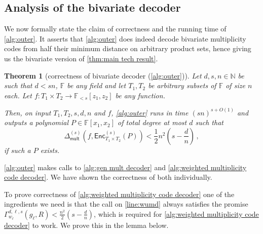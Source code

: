 \documentclass{article}
\newtheorem{theorem}{Theorem}\newtheorem{lemma}[theorem]{Lemma}\newtheorem{proposition}[theorem]{Proposition}\newtheorem{corollary}[theorem]{Corollary}\newtheorem{definition}[theorem]{Definition}\newtheorem{claim}[theorem]{Claim}\newtheorem{remark}[theorem]{Remark}\newtheorem{observation}[theorem]{Observation}
\def\Natural{\mathbb{N}}
\def\Field{\mathbb{F}}
\let\N\Natural
\let\F\Field
\newcommand{\enc}{{\mathsf{Enc}}}
\newcommand{\Delm}{\Delta_{\mathsf{mult}}}
\begin{document}
	\subsection{Analysis of the bivariate decoder}
	
	We now formally state the claim of correctness and the running time of
	\cref{alg:outer}. It asserts that \cref{alg:outer} does indeed decode
	bivariate  multiplicity codes from half their minimum distance on
	arbitrary product sets, hence giving us the bivariate version of \cref{thm:main tech result}.
	
	\begin{theorem}[correctness of bivariate decoder (\cref{alg:outer})]%
		\label{THM:CORRECTNESS_OF_BIVARIATE_DECODER}
		Let $d, s, n \in \N$ be such that $d < sn$, $\F$ be any  field and let
		$T_1, T_2$ be arbitrary subsets of $\F$ of size $n$ each. Let $f\colon
		T_1 \times T_2 \to \F_{<s}[z_1, z_2]$ be any function. 
		
		Then, on input $T_1, T_2, s, d, n$ and $f$, \cref{alg:outer} runs in time $(sn)^{s + O(1)}$ and outputs a polynomial $P \in \F[x_1, x_2]$ of total degree at most $d$ such that  
		\[
		\Delm^{(s)}(f,\enc^{(s)}_{T_1 \times T_2}(P)) < \frac{1}{2} n^2 \left(s-\frac{d}{n} \right) \, ,
		\]
		if such a $P$ exists. 
	\end{theorem}
	
	\cref{alg:outer} makes calls to \cref{alg:gen mult decoder} and \cref{alg:weighted multiplicity code decoder}. We have shown the correctness of both individually. 
	
	To prove correctness of \cref{alg:weighted multiplicity code decoder} one of the ingredients we need is that the call on \cref{line:wumd} always satisfies the promise $\Gamma_{w_\ell}^{d, \ell, s}(g_\ell,
	R) < \frac{n^2}{2}(s-\frac{d}{n})$, which is required for \cref{alg:weighted multiplicity code decoder} to work. We prove this in the lemma below.
	
\end{document}
